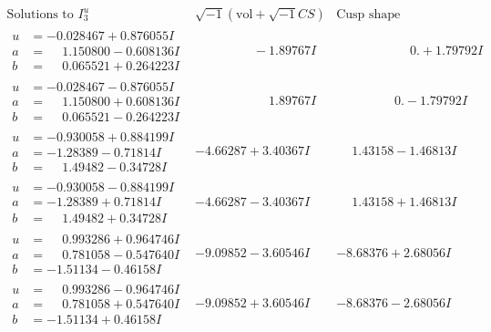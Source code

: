 \documentclass[1p]{elsarticle_modified}
\theoremstyle{definition}
\newcommand{\I}{\sqrt{-1}}
\begin{document}
$$\begin{array}{c|c|c}  
\text{Solutions to }I^u_{3}& \I (\text{vol} + \sqrt{-1}CS) & \text{Cusp shape}\\
 \hline 
\begin{aligned}
u &= -0.028467 + 0.876055 I \\
a &= \phantom{-}1.150800 - 0.608136 I \\
b &= \phantom{-}0.065521 + 0.264223 I\end{aligned}
 & \phantom{-0.000000 } -1.89767 I & \phantom{-0.000000 -}0. + 1.79792 I \\ \hline\begin{aligned}
u &= -0.028467 - 0.876055 I \\
a &= \phantom{-}1.150800 + 0.608136 I \\
b &= \phantom{-}0.065521 - 0.264223 I\end{aligned}
 & \phantom{-0.000000 -}1.89767 I & \phantom{-0.000000 } 0. - 1.79792 I \\ \hline\begin{aligned}
u &= -0.930058 + 0.884199 I \\
a &= -1.28389 - 0.71814 I \\
b &= \phantom{-}1.49482 - 0.34728 I\end{aligned}
 & -4.66287 + 3.40367 I & \phantom{-}1.43158 - 1.46813 I \\ \hline\begin{aligned}
u &= -0.930058 - 0.884199 I \\
a &= -1.28389 + 0.71814 I \\
b &= \phantom{-}1.49482 + 0.34728 I\end{aligned}
 & -4.66287 - 3.40367 I & \phantom{-}1.43158 + 1.46813 I \\ \hline\begin{aligned}
u &= \phantom{-}0.993286 + 0.964746 I \\
a &= \phantom{-}0.781058 - 0.547640 I \\
b &= -1.51134 - 0.46158 I\end{aligned}
 & -9.09852 - 3.60546 I & -8.68376 + 2.68056 I \\ \hline\begin{aligned}
u &= \phantom{-}0.993286 - 0.964746 I \\
a &= \phantom{-}0.781058 + 0.547640 I \\
b &= -1.51134 + 0.46158 I\end{aligned}
 & -9.09852 + 3.60546 I & -8.68376 - 2.68056 I \\ \hline\begin{aligned}

\end{aligned}
\end{array}$$
\end{document}
